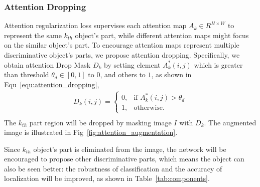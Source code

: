 \documentclass[10pt,twocolumn,letterpaper]{article}
\begin{document}
\subsubsection{Attention Dropping}
Attention regularization loss supervises each attention map $A_k\in R^{H \times W}$ to represent the same $k_{th}$ object's part, while different attention maps might focus on the similar object's part. To encourage attention maps represent multiple discriminative object's parts, we propose attention dropping. Specifically, we obtain attention Drop Mask $D_k$ by setting element $A^*_k(i, j)$ which is greater than threshold $\theta_d\in [0, 1]$ to $0$, and others to $1$, as shown in Equ~\ref{equ:attention_dropping},
\begin{equation}
  \begin{array}{l}
        D_k(i, j)=\begin{cases}
            0, & \text{if $A^*_k(i, j) > \theta_d $}\\
            1, & \text{otherwise}.
          \end{cases} \\
  \end{array}
    \label{equ:attention_dropping}
\end{equation}
The $k_{th}$ part region will be dropped by masking image $I$ with $D_k$. The augmented image is illustrated in Fig~\ref{fig:attention_augmentation}.

Since $k_{th}$ object's part is eliminated from the image, the network will be encouraged to propose other discriminative parts, which means the object can also be seen better: the robustness of classification and the accuracy of localization will be improved, as shown in Table~\ref{tab:components}.
\end{document}
